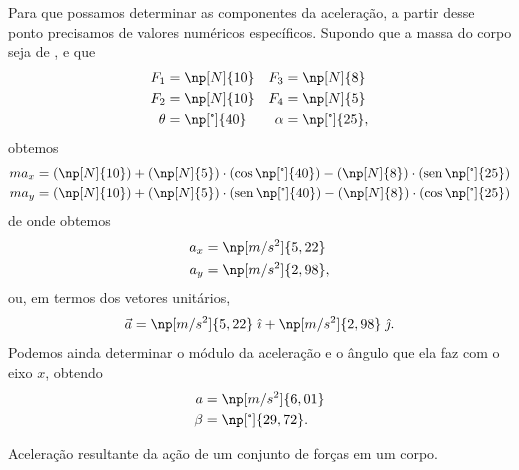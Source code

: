 Para que possamos determinar as componentes da aceleração, a partir desse ponto precisamos de valores numéricos específicos. Supondo que a massa do corpo seja de , e que
\begin{align*}
    F_1 &= \np[N]{10} & F_3 &= \np[N]{8} \\
    F_2 &= \np[N]{10} & F_4 &= \np[N]{5} \\
    \theta &= \np[\tcdegree]{40} & \alpha &= \np[\tcdegree]{25},
\end{align*}
%
obtemos
\begin{align}
    m a_x &= (\np[N]{10}) + (\np[N]{5})\cdot(\cos \np[\tcdegree]{40}) - (\np[N]{8})\cdot(\sen \np[\tcdegree]{25}) \\
    m a_y &= (\np[N]{10}) + (\np[N]{5})\cdot(\sen \np[\tcdegree]{40}) - (\np[N]{8})\cdot(\cos \np[\tcdegree]{25})
\end{align}
%
de onde obtemos
\begin{align}
    a_x &= \np[m/s^2]{5,22}\\
    a_y &= \np[m/s^2]{2,98},
\end{align}
%
ou, em termos dos vetores unitários,
\begin{equation}
    \vec{a} = \np[m/s^2]{5,22} \;\versi + \np[m/s^2]{2,98} \;\versj.
\end{equation}
%
Podemos ainda determinar o módulo da aceleração e o ângulo que ela faz com o eixo $x$, obtendo
\begin{align}
    a &= \np[m/s^2]{6,01}\\
    \beta &= \np[\tcdegree]{29,72}.
\end{align}

\begin{marginfigure}
\centering
{}
\caption{Aceleração resultante da ação de um conjunto de forças em um corpo.\label{Fig:CorpoSujeitoForcasNaoEquilibrioRefAcel}}
\end{marginfigure}

